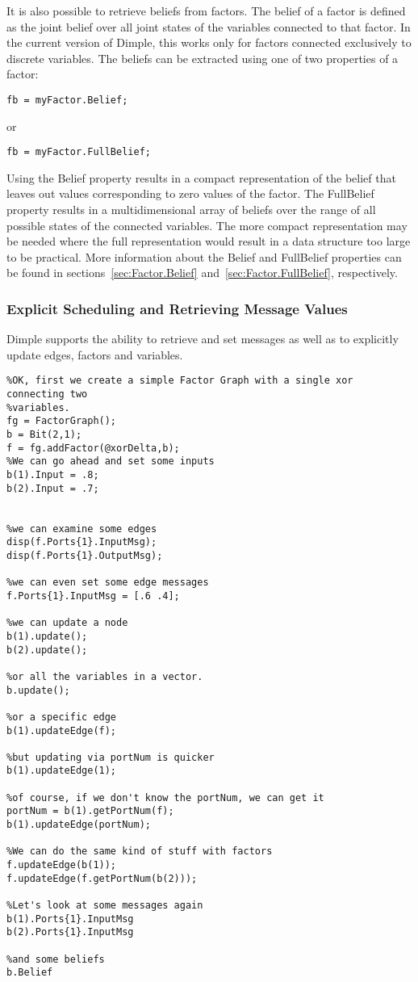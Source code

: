 It is also possible to retrieve beliefs from factors.  The belief of a factor is defined as the joint belief over all joint states of the variables connected to that factor.  In the current version of Dimple, this works only for factors connected exclusively to discrete variables.  The beliefs can be extracted using one of two properties of a factor:

\begin{lstlisting}
fb = myFactor.Belief;
\end{lstlisting}

or

\begin{lstlisting}
fb = myFactor.FullBelief;
\end{lstlisting}

Using the Belief property results in a compact representation of the belief that leaves out values corresponding to zero values of the factor.  The FullBelief property results in a multidimensional array of beliefs over the range of all possible states of the connected variables.  The more compact representation may be needed where the full representation would result in a data structure too large to be practical.  More information about the Belief and FullBelief properties can be found in sections~\ref{sec:Factor.Belief} and~\ref{sec:Factor.FullBelief}, respectively.

 
\subsubsection{Explicit Scheduling and Retrieving Message Values}

Dimple supports the ability to retrieve and set messages as well as to explicitly update edges, factors and variables.

\begin{lstlisting}
%OK, first we create a simple Factor Graph with a single xor connecting two  
%variables.
fg = FactorGraph(); 
b = Bit(2,1);
f = fg.addFactor(@xorDelta,b);
%We can go ahead and set some inputs
b(1).Input = .8;
b(2).Input = .7;


%we can examine some edges 
disp(f.Ports{1}.InputMsg);
disp(f.Ports{1}.OutputMsg);

%we can even set some edge messages
f.Ports{1}.InputMsg = [.6 .4];

%we can update a node 
b(1).update();
b(2).update();

%or all the variables in a vector.
b.update();

%or a specific edge
b(1).updateEdge(f);
 
%but updating via portNum is quicker
b(1).updateEdge(1);

%of course, if we don't know the portNum, we can get it
portNum = b(1).getPortNum(f);
b(1).updateEdge(portNum);

%We can do the same kind of stuff with factors
f.updateEdge(b(1));
f.updateEdge(f.getPortNum(b(2)));

%Let's look at some messages again
b(1).Ports{1}.InputMsg
b(2).Ports{1}.InputMsg

%and some beliefs
b.Belief
\end{lstlisting}

